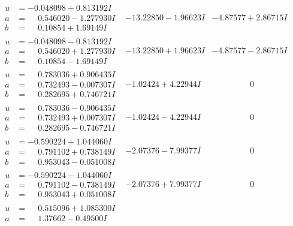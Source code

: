 \documentclass[1p]{elsarticle_modified}
\theoremstyle{definition}
\begin{document}
$$\begin{array}{c|c|c}
\begin{aligned}
u &= -0.048098 + 0.813192 I \\
a &= \phantom{-}0.546020 - 1.277930 I \\
b &= \phantom{-}0.10854 + 1.69149 I\end{aligned}
 & -13.22850 - 1.96623 I & -4.87577 + 2.86715 I \\ \hline\begin{aligned}
u &= -0.048098 - 0.813192 I \\
a &= \phantom{-}0.546020 + 1.277930 I \\
b &= \phantom{-}0.10854 - 1.69149 I\end{aligned}
 & -13.22850 + 1.96623 I & -4.87577 - 2.86715 I \\ \hline\begin{aligned}
u &= \phantom{-}0.783036 + 0.906435 I \\
a &= \phantom{-}0.732493 - 0.007307 I \\
b &= \phantom{-}0.282695 + 0.746721 I\end{aligned}
 & -1.02424 + 4.22944 I & \phantom{-0.000000 } 0 \\ \hline\begin{aligned}
u &= \phantom{-}0.783036 - 0.906435 I \\
a &= \phantom{-}0.732493 + 0.007307 I \\
b &= \phantom{-}0.282695 - 0.746721 I\end{aligned}
 & -1.02424 - 4.22944 I & \phantom{-0.000000 } 0 \\ \hline\begin{aligned}
u &= -0.590224 + 1.044060 I \\
a &= \phantom{-}0.791102 + 0.738149 I \\
b &= \phantom{-}0.953043 - 0.051008 I\end{aligned}
 & -2.07376 - 7.99377 I & \phantom{-0.000000 } 0 \\ \hline\begin{aligned}
u &= -0.590224 - 1.044060 I \\
a &= \phantom{-}0.791102 - 0.738149 I \\
b &= \phantom{-}0.953043 + 0.051008 I\end{aligned}
 & -2.07376 + 7.99377 I & \phantom{-0.000000 } 0 \\ \hline\begin{aligned}
u &= \phantom{-}0.515096 + 1.085300 I \\
a &= \phantom{-}1.37662 - 0.49500 I \\

\end{aligned}
\end{array}$$
\end{document}
